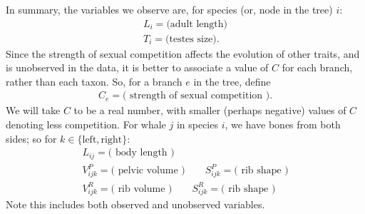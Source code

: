 \documentclass{article}
\begin{document}
In summary, the variables we observe are, for species (or, node in the tree) $i$:
\begin{gather*}
    L_i = \text{(adult length)} \\
    T_i = \text{(testes size)} .
\end{gather*}
Since the strength of sexual competition affects the evolution of other traits,
and is unobserved in the data,
it is better to associate a value of $C$ for each branch, rather than each taxon.
So, for a branch $e$ in the tree, define
\begin{gather*}
    C_{e} = \text{( strength of sexual competition )}  .
\end{gather*}
We will take $C$ to be a real number, with smaller (perhaps negative) values of $C$ denoting less competition.
For whale $j$ in species $i$, we have bones from both sides; so for $k \in \{\text{left},\text{right}\}$:
\begin{gather*}
    L_{ij} = \text{( body length )} \\
    V^P_{ijk} = \text{( pelvic volume )} \qquad S^P_{ijk} = \text{( rib shape )} \\
    V^R_{ijk} = \text{( rib volume )} \qquad S^R_{ijk} = \text{( rib shape )} 
\end{gather*}
Note this includes both observed and unobserved variables.
\end{document}
